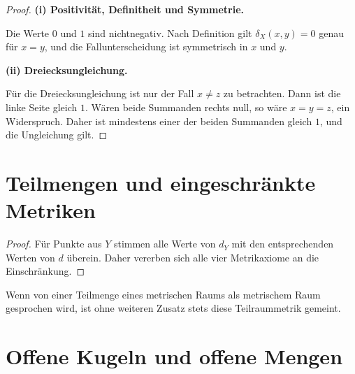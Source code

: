 \documentclass[main.tex]{subfiles}
\begin{document}
\begin{proof}
\par\medskip\noindent\textbf{(i) Positivität, Definitheit und Symmetrie.}\par
Die Werte \(0\) und \(1\) sind nichtnegativ. Nach Definition gilt
\(\delta_X(x,y)=0\) genau für \(x=y\), und die Fallunterscheidung ist
symmetrisch in \(x\) und \(y\). \par\medskip\noindent\textbf{(ii) Dreiecksungleichung.}\par
Für die Dreiecksungleichung ist nur der Fall
\(x\neq z\) zu betrachten. Dann ist die linke Seite gleich \(1\). Wären
beide Summanden rechts null, so wäre \(x=y=z\), ein Widerspruch. Daher ist
mindestens einer der beiden Summanden gleich \(1\), und die Ungleichung gilt.
\end{proof}

\section{Teilmengen und eingeschränkte Metriken}


\begin{proof}
Für Punkte aus \(Y\) stimmen alle Werte von \(d_Y\) mit den entsprechenden
Werten von \(d\) überein. Daher vererben sich alle vier Metrikaxiome an die
Einschränkung.
\end{proof}

Wenn von einer Teilmenge eines metrischen Raums als metrischem Raum gesprochen
wird, ist ohne weiteren Zusatz stets diese Teilraummetrik gemeint.

\section{Offene Kugeln und offene Mengen}

\end{document}
